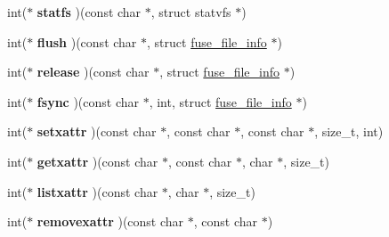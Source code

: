 \begin{DoxyCompactItemize}
\item 
int($\ast$ {\bfseries statfs} )(const char $\ast$, struct statvfs $\ast$)\hypertarget{structfuse__operations_a76d29dba617a64321cf52d62cd969292}{}\label{structfuse__operations_a76d29dba617a64321cf52d62cd969292}

\item 
int($\ast$ {\bfseries flush} )(const char $\ast$, struct \hyperlink{structfuse__file__info}{fuse\+\_\+file\+\_\+info} $\ast$)\hypertarget{structfuse__operations_a6bfecd61ddd58f74820953ee23b19ef3}{}\label{structfuse__operations_a6bfecd61ddd58f74820953ee23b19ef3}

\item 
int($\ast$ {\bfseries release} )(const char $\ast$, struct \hyperlink{structfuse__file__info}{fuse\+\_\+file\+\_\+info} $\ast$)\hypertarget{structfuse__operations_a4a6f1b50c583774125b5003811ecebce}{}\label{structfuse__operations_a4a6f1b50c583774125b5003811ecebce}

\item 
int($\ast$ {\bfseries fsync} )(const char $\ast$, int, struct \hyperlink{structfuse__file__info}{fuse\+\_\+file\+\_\+info} $\ast$)\hypertarget{structfuse__operations_abaa2a0bdc9b9955a399ea6973f6f4927}{}\label{structfuse__operations_abaa2a0bdc9b9955a399ea6973f6f4927}

\item 
int($\ast$ {\bfseries setxattr} )(const char $\ast$, const char $\ast$, const char $\ast$, size\+\_\+t, int)\hypertarget{structfuse__operations_aa45a72b6238ec1e97f910d940aaddc51}{}\label{structfuse__operations_aa45a72b6238ec1e97f910d940aaddc51}

\item 
int($\ast$ {\bfseries getxattr} )(const char $\ast$, const char $\ast$, char $\ast$, size\+\_\+t)\hypertarget{structfuse__operations_aa3b04e186793cf6c6b81bf7fea5be417}{}\label{structfuse__operations_aa3b04e186793cf6c6b81bf7fea5be417}

\item 
int($\ast$ {\bfseries listxattr} )(const char $\ast$, char $\ast$, size\+\_\+t)\hypertarget{structfuse__operations_a6fbfd692db6efb23a3f84b6926c398af}{}\label{structfuse__operations_a6fbfd692db6efb23a3f84b6926c398af}

\item 
int($\ast$ {\bfseries removexattr} )(const char $\ast$, const char $\ast$)\hypertarget{structfuse__operations_ad8078e468e2ef46f8084bc8f58252000}{}\label{structfuse__operations_ad8078e468e2ef46f8084bc8f58252000}


\end{DoxyCompactItemize}

